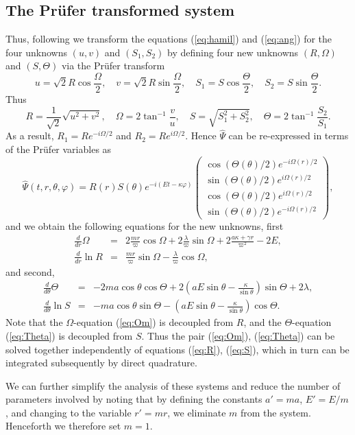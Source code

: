 \documentclass[11 pt]{article}
\newcommand\Om{\Omega}
\renewcommand\({\left(}
\renewcommand\){\right)}
\renewcommand\Om{\Omega}
\newcommand\<{\langle}
\renewcommand\>{\rangle}
\newcommand\8{\infty}
\newcommand\beq{\begin{equation}}
\newcommand\eeq{\end{equation}}
\newcommand{\ka} {\kappa}
\newcommand{\la} {\lambda}\newcommand{\La}{\Lambda}
\newcommand{\De}{\varpi}
\newcommand{\bna}{\begin{eqnarray}}
\newcommand{\ena}{\end{eqnarray}}
\begin{document}
\subsection{The Pr\"ufer transformed system}
  Thus, following \cite{KTZzGKNDa} we transform the equations (\ref{eq:hamil}) and (\ref{eq:ang}) for the four unknowns $(u,v)$ and $(S_1,S_2)$
by defining four new unknowns $(R,\Om)$ and $(S,\Theta)$ via the Pr\"ufer transform 
\beq\label{eq:prufer}
u =\sqrt{2} R \cos\frac{\Om}{2},\quad v = \sqrt{2} R \sin\frac{\Om}{2},\quad S_1 = S \cos\frac{\Theta}{2},\quad S_2 = S \sin\frac{\Theta}{2}.
\eeq
Thus
\beq
R =\frac{1}{\sqrt{2}}\sqrt{u^2+v^2},\quad\Om = 2\tan^{-1}\frac{v}{u},\quad S = \sqrt{S_1^2+S_2^2},\quad \Theta = 2\tan^{-1}\frac{S_2}{S_1}.
\eeq
As a result, $R_1 =  Re^{-i\Om/2}$ and $R_2 = Re^{i\Om/2}$.  Hence $\hat{\Psi}$ can be re-expressed in terms of the Pr\"ufer variables as
\beq\label{ontology}
\hat{\Psi}(t,r,\theta,\varphi) = R(r)S(\theta)e^{-i(Et-\ka \varphi)} \left(\begin{array}{l}
 \cos(\Theta(\theta)/2)e^{-i\Om(r)/2}\\
\sin(\Theta(\theta)/2) e^{i\Om(r)/2}\\
\cos(\Theta(\theta)/2)e^{i\Om(r)/2}\\
\sin(\Theta(\theta)/2)e^{-i\Om(r)/2}\end{array}\right),
\eeq
and we obtain the following equations for the new unknowns, first
\bna
\frac{d}{dr}\Om    &=& 2 \frac{mr}{\De} \cos\Om + 2\frac{\la}{\De} \sin\Om +2\frac{a\kappa + \gamma r}{\De^2} - 2E ,\label{eq:Om}\\
\frac{d}{dr} \ln R &=& \frac{mr}{\De}\sin\Om - \frac{\la}{\De} \cos\Om ,\label{eq:R}
\ena
and second,
\bna
\frac{d}{d\theta}\Theta &=& -2ma\cos\theta\cos\Theta + 2\left(aE \sin\theta - \frac{\kappa}{\sin\theta}\right)\sin\Theta + 2\la,\label{eq:Theta}\\
\frac{d}{d\theta} \ln S &=& -ma \cos\theta\sin\Theta - \left(aE\sin\theta - \frac{\kappa}{\sin\theta}\right)\cos\Theta. \label{eq:S}
\ena
 Note that the $\Om$-equation (\ref{eq:Om}) is decoupled from $R$, and the $\Theta$-equation (\ref{eq:Theta}) is decoupled from $S$.
  Thus the pair (\ref{eq:Om}), (\ref{eq:Theta}) can be solved together independently of equations (\ref{eq:R}), (\ref{eq:S}), which in turn
  can be integrated subsequently by direct quadrature. 

 We can further simplify the analysis of these systems and reduce the number of parameters involved by noting that 
by defining the constants $a'=ma$, $E'=E/m$, and changing to the variable $r'=mr$, we eliminate $m$ from the system.
 Henceforth we therefore set $m=1$. 
\end{document}
